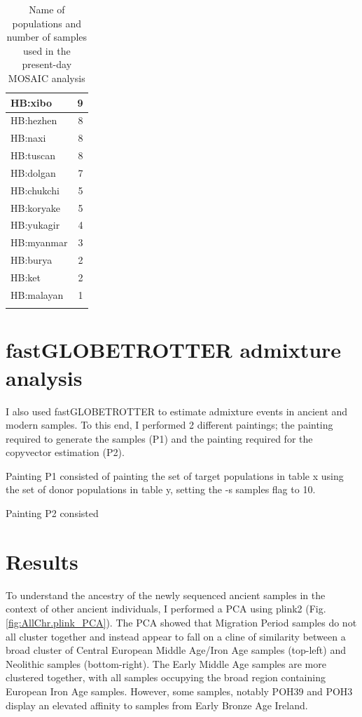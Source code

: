 \begin{table}
\begin{tabular}{l|r}
HB:xibo & 9\\
\hline
HB:hezhen & 8\\
\hline
HB:naxi & 8\\
\hline
HB:tuscan & 8\\
\hline
HB:dolgan & 7\\
\hline
HB:chukchi & 5\\
\hline
HB:koryake & 5\\
\hline
HB:yukagir & 4\\
\hline
HB:myanmar & 3\\
\hline
HB:burya & 2\\
\hline
HB:ket & 2\\
\hline
HB:malayan & 1\\
\hline
\label{table:present-day_inds_MOSAIC}
\end{tabular}
\caption{Name of populations and number of samples used in the present-day MOSAIC analysis}
\end{table}

\section{fastGLOBETROTTER admixture analysis}

I also used fastGLOBETROTTER to estimate admixture events in ancient and modern samples. To this end, I performed 2 different paintings; the painting required to generate the samples (P1) and the painting required for the copyvector estimation (P2).

Painting P1 consisted of painting the set of target populations in table x using the set of donor populations in table y, setting the -s samples flag to 10.  

Painting P2 consisted

\section{Results}

To understand the ancestry of the newly sequenced ancient samples in the context of other ancient individuals, I performed a PCA using plink2 (Fig. \ref{fig:AllChr.plink_PCA}). The PCA showed that Migration Period samples do not all cluster together and instead appear to fall on a cline of similarity between a broad cluster of Central European Middle Age/Iron Age samples (top-left) and Neolithic samples (bottom-right). The Early Middle Age samples are more clustered together, with all samples occupying the broad region containing European Iron Age samples. However, some samples, notably POH39 and POH3 display an elevated affinity to samples from Early Bronze Age Ireland. 

